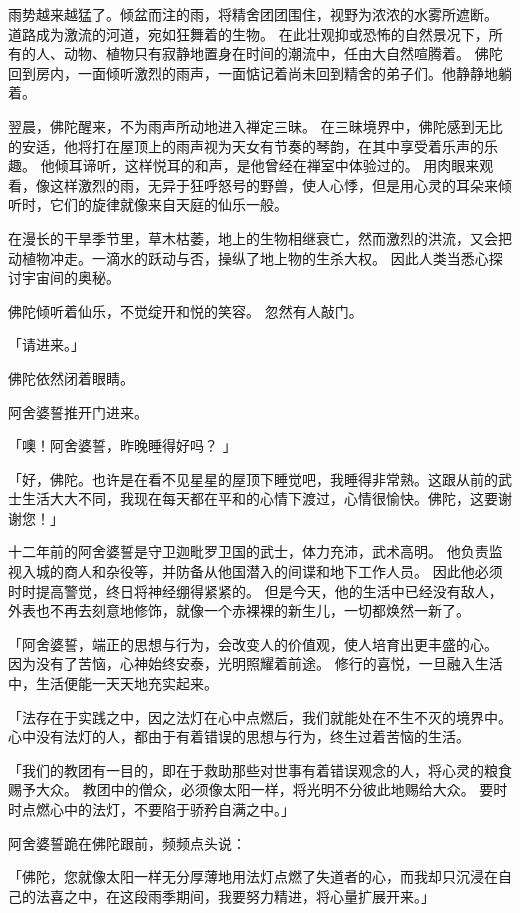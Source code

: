 \documentclass[twoside,openany]{book}
\begin{document}
雨势越来越猛了。倾盆而注的雨，将精舍团团围住，视野为浓浓的水雾所遮断。
道路成为激流的河道，宛如狂舞着的生物。
在此壮观抑或恐怖的自然景况下，所有的人、动物、植物只有寂静地置身在时间的潮流中，任由大自然喧腾着。
佛陀回到房内，一面倾听激烈的雨声，一面惦记着尚未回到精舍的弟子们。他静静地躺着。

翌晨，佛陀醒来，不为雨声所动地进入禅定三昧。
在三昧境界中，佛陀感到无比的安适，他将打在屋顶上的雨声视为天女有节奏的琴韵，在其中享受着乐声的乐趣。
他倾耳谛听，这样悦耳的和声，是他曾经在禅室中体验过的。
用肉眼来观看，像这样激烈的雨，无异于狂呼怒号的野兽，使人心悸，但是用心灵的耳朵来倾听时，它们的旋律就像来自天庭的仙乐一般。

在漫长的干旱季节里，草木枯萎，地上的生物相继衰亡，然而激烈的洪流，又会把动植物冲走。一滴水的跃动与否，操纵了地上物的生杀大权。
因此人类当悉心探讨宇宙间的奥秘。

佛陀倾听着仙乐，不觉绽开和悦的笑容。
忽然有人敲门。

「请进来。」

佛陀依然闭着眼睛。

阿舍婆誓推开门进来。

「噢！阿舍婆誓，昨晚睡得好吗？	」

「好，佛陀。也许是在看不见星星的屋顶下睡觉吧，我睡得非常熟。这跟从前的武士生活大大不同，我现在每天都在平和的心情下渡过，心情很愉快。佛陀，这要谢谢您！」

十二年前的阿舍婆誓是守卫迦毗罗卫国的武士，体力充沛，武术高明。
他负责监视入城的商人和杂役等，并防备从他国潜入的间谍和地下工作人员。
因此他必须时时提高警觉，终日将神经绷得紧紧的。
但是今天，他的生活中已经没有敌人，外表也不再去刻意地修饰，就像一个赤裸裸的新生儿，一切都焕然一新了。

「阿舍婆誓，端正的思想与行为，会改变人的价值观，使人培育出更丰盛的心。
因为没有了苦恼，心神始终安泰，光明照耀着前途。
修行的喜悦，一旦融入生活中，生活便能一天天地充实起来。

「法存在于实践之中，因之法灯在心中点燃后，我们就能处在不生不灭的境界中。
心中没有法灯的人，都由于有着错误的思想与行为，终生过着苦恼的生活。

「我们的教团有一目的，即在于救助那些对世事有着错误观念的人，将心灵的粮食赐予大众。
教团中的僧众，必须像太阳一样，将光明不分彼此地赐给大众。
要时时点燃心中的法灯，不要陷于骄矜自满之中。」

阿舍婆誓跪在佛陀跟前，频频点头说：

「佛陀，您就像太阳一样无分厚薄地用法灯点燃了失道者的心，而我却只沉浸在自己的法喜之中，在这段雨季期间，我要努力精进，将心量扩展开来。」
\end{document}
